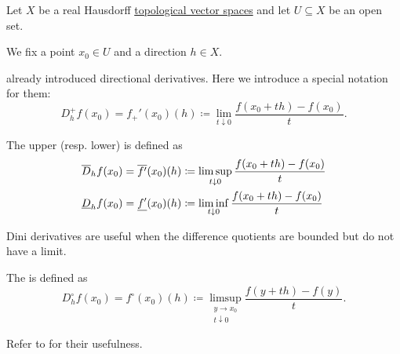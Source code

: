 \begin{definition}\label{def:nonsmooth_derivatives}
  Let \( X \) be a real Hausdorff \hyperref[def:topological_vector_space]{topological vector spaces} and let \( U \subseteq X \) be an open set.

  We fix a point \( x_0 \in U \) and a direction \( h \in X \).

  \begin{DefEnum}
     already introduced directional derivatives. Here we introduce a special notation for them:
    \begin{equation*}
      D_h^+ f(x_0) = f_+'(x_0)(h) \coloneqq \lim_{t \downarrow 0} \frac {f(x_0 + th) - f(x_0)} t.
    \end{equation*}

    \cite[definition 11.18]{Clarke2013} The upper (resp. lower)  is defined as
    \begin{align*}
      \overline{D}_h f(x_0) = \overline{f'}(x_0)(h) & \coloneqq \limsup_{t \downarrow 0} \frac {f(x_0 + th) - f(x_0)} t
      \\
      \underline{D}_h f(x_0) = \underline{f'}(x_0)(h) & \coloneqq \liminf_{t \downarrow 0} \frac {f(x_0 + th) - f(x_0)} t
    \end{align*}

    Dini derivatives are useful when the difference quotients are bounded but do not have a limit.

    \cite[section 10.1]{Clarke2013} The  is defined as
    \begin{equation*}
      D_h^\circ f(x_0)
      =
      f^\circ(x_0)(h)
      \coloneqq
      \limsup_{\substack{y \to x_0 \\ t \downarrow 0}} \frac {f(y + th) - f(y)} t.
    \end{equation*}

    Refer to  for their usefulness.
  \end{DefEnum}
\end{definition}
